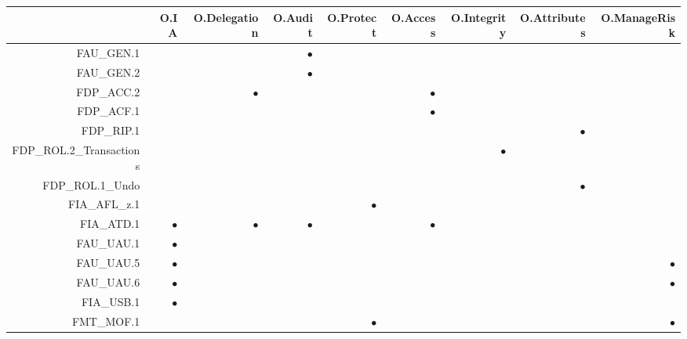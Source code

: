 \documentclass[12pt,english]{scrbook}
\newcommand{\oh}{$\bullet$}
\begin{document}
\begin{table}
    \scriptsize
    \begin{tabular}{rRRRRRRRR}
        \toprule
                            & O.IA & O.Delegation & O.Audit & O.Protect & O.Access & O.Integrity & O.Attributes & O.ManageRisk \\
        \midrule

FAU\_GEN.1                  &      &              & \oh     &           &          &             &              &              \\
FAU\_GEN.2                  &      &              & \oh     &           &          &             &              &              \\
FDP\_ACC.2                  &      & \oh          &         &           & \oh      &             &              &              \\
FDP\_ACF.1                  &      &              &         &           &  \oh     &             &              &              \\
FDP\_RIP.1                  &      &              &         &           &          &             &  \oh         &              \\
FDP\_ROL.2\_Transactions    &      &              &         &           &          &   \oh       &              &              \\
FDP\_ROL.1\_Undo            &      &              &         &           &          &             &  \oh         &              \\
FIA\_AFL\_z.1               &      &              &         &   \oh     &          &             &              &              \\
FIA\_ATD.1                  & \oh  &  \oh         &   \oh   &           & \oh      &             &              &              \\
FAU\_UAU.1                  & \oh  &              &         &           &          &             &              &              \\
FAU\_UAU.5                  & \oh  &              &         &           &          &             &              & \oh          \\
FAU\_UAU.6                  & \oh  &              &         &           &          &             &              & \oh          \\
FIA\_USB.1                  & \oh  &              &         &           &          &             &              &              \\
FMT\_MOF.1                  &      &              &         &  \oh      &          &             &              & \oh          \\

\end{tabular}
\end{table}
\end{document}
